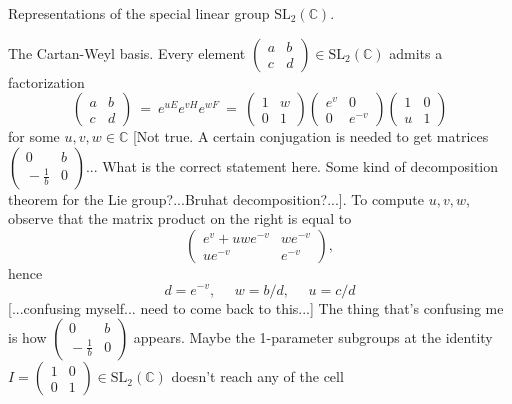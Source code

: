 \documentclass[letterpaper,11pt, reqno]{amsart}
\newtheorem{monodromy theorem}{Monodromy Theorem}[subsection]
\newtheorem{wild conjecture}[theorem]{Wild Conjecture}
\newtheorem{research objectives}{Research objectives}[subsection]
\newtheorem{research question}[theorem]{Research questions}
\newtheorem{aside question}[theorem]{Aside question}
\newtheorem{audio example}[theorem]{\loudspeaker[3] Example}
\newtheorem{blank remark}[theorem]{}
\newtheorem{terminology and comment}[theorem]{Terminology and comment}
\newtheorem{purity hypothesis}[theorem]{Purity hypothesis}
\newtheorem{corollary of the purity hypothesis}[theorem]{Corollary of the purity hypothesis}
\newcommand{\CC} {{\mathbb C}}
\numberwithin{equation}{theorem}
\begin{document}
\begin{section}{Representations of the special linear group $\text{SL}_{2}(\CC)$.}
\begin{subsection}{The Cartan-Weyl basis.}
Every element $\left(\begin{smallmatrix} a & b \\ c & d\end{smallmatrix}\right)\in\text{SL}_{2}(\CC)$ admits a factorization
	$$
	\left(\!\begin{array}{cc}a & b \\ c & d\end{array}\!\right)
	\ =\ 
	e^{u E}e^{v H}e^{w F}
	\ =\ 
	\left(\!\begin{array}{cc}1 & w \\ 0 & 1\end{array}\!\right)
	\left(\!\begin{array}{cc}e^{v} & 0 \\ 0 & e^{-v}\end{array}\!\right)
	\left(\!\begin{array}{cc}1 & 0 \\ u & 1\end{array}\!\right)
	$$
for some $u,v,w\in\CC$ {\color{red} [Not true. A certain conjugation is needed to get matrices $\left(\begin{smallmatrix} 0 & b \\ \!\!-\tfrac{1}{b} & 0\end{smallmatrix}\right)$... What is the correct statement here. Some kind of decomposition theorem for the Lie group?...Bruhat decomposition?...]}. To compute $u,v,w$, observe that the matrix product on the right is equal to
	$$
	\left(\!\begin{array}{cc}e^v+uwe^{-v} & we^{-v} \\ ue^{-v} & e^{-v}\end{array}\!\right),
	$$
hence
	$$
	d=e^{-v},
	\ \ \ \ \ \ 
	w=b/d,
	\ \ \ \ \ \ 
	u=c/d
	$$
{\color{red} [...confusing myself... need to come back to this...]} The thing that's confusing me is how $\left(\begin{smallmatrix} 0 & b \\ \!\!-\tfrac{1}{b} & 0\end{smallmatrix}\right)$ appears. Maybe the 1-parameter subgroups at the identity $I=\left(\begin{smallmatrix} 1 & 0 \\ 0 & 1\end{smallmatrix}\right)\in\text{SL}_{2}(\CC)$ doesn't reach any of the cell

\end{subsection}
\end{section}
\end{document}
